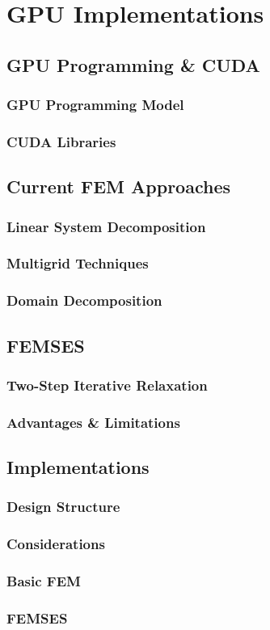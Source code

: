 \clearpage
\chapter{GPU Implementations}

\section{GPU Programming \& CUDA}

\subsection{GPU Programming Model}

\subsection{CUDA Libraries}

\section{Current FEM Approaches}

\subsection{Linear System Decomposition}

\subsection{Multigrid Techniques}

\subsection{Domain Decomposition}

\section{FEMSES}

\subsection{Two-Step Iterative Relaxation}

\subsection{Advantages \& Limitations}

\section{Implementations}

\subsection{Design Structure}

\subsection{Considerations}

\subsection{Basic FEM}

\subsection{FEMSES}
